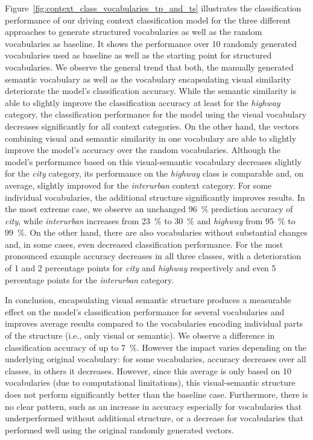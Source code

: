 Figure~\ref{fig:context_class_vocabularies_tp_and_ts} illustrates the classification performance of our driving context classification model for the three different approaches to generate structured vocabularies as well as the random vocabularies as baseline. 
It shows the performance over \num{10} randomly generated vocabularies used as baseline as well as the starting point for structured vocabularies.
We observe the general trend that both, the manually generated semantic vocabulary as well as the vocabulary encapsulating visual similarity deteriorate the model's classification accuracy.
While the semantic similarity is able to slightly improve the classification accuracy at least for the \emph{highway} category, the classification performance for the model using the visual vocabulary decreases significantly for all context categories.
On the other hand, the vectors combining visual and semantic similarity in one vocabulary are able to slightly improve the model's accuracy over the random vocabularies.
Although the model's performance based on this visual-semantic vocabulary decreases slightly for the \emph{city} category, its performance on the \emph{highway} class is comparable and, on average, slightly improved for the \emph{interurban} context category.
For some individual vocabularies, the additional structure significantly improves results.
In the most extreme case, we observe an unchanged \SI{96}{\percent} prediction accuracy of \emph{city}, while \emph{interurban} increases from \SI{23}{\percent} to \SI{30}{\percent} and \emph{highway} from \SI{95}{\percent} to \SI{99}{\percent}. 
On the other hand, there are also vocabularies without substantial changes and, in some cases, even decreased classification performance.
For the most pronounced example accuracy decreases in all three classes, with a deterioration of \num{1} and \num{2} percentage points for \emph{city} and \emph{highway} respectively and even \num{5} percentage points for the \emph{interurban} category.

In conclusion, encapsulating visual semantic structure produces a measurable effect on the model's classification performance for several vocabularies and improves average results compared to the vocabularies encoding individual parts of the structure (i.e., only visual or semantic).
We observe a difference in classification accuracy of up to \SI{7}{\percent}.
However the impact varies depending on the underlying original vocabulary: for some vocabularies, accuracy decreases over all classes, in others it decreases.
However, since this average is only based on \num{10} vocabularies (due to computational limitations), this visual-semantic structure does not perform significantly better than the baseline case.
Furthermore, there is no  clear pattern, such as an increase in accuracy especially for vocabularies that underperformed without additional structure, or a decrease for vocabularies that performed well using the original randomly generated vectors.


